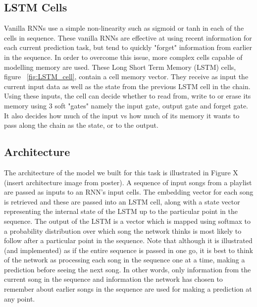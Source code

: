 \documentclass{article} %
\begin{document}
\subsection{LSTM Cells}
Vanilla RNNs use a simple non-linearity such as sigmoid or tanh in each of the cells in sequence. These vanilla RNNs are effective at using recent information for each current prediction task, but tend to quickly "forget" information from earlier in the sequence. In order to overcome this issue, more complex cells capable of modelling memory are used. These Long Short Term Memory (LSTM) cells, figure ~\ref{fig:LSTM_cell}, contain a cell memory vector. They receive as input the current input data as well as the state from the previous LSTM cell in the chain. Using these inputs, the cell can decide whether to read from, write to or erase its memory using 3 soft "gates" namely the input gate, output gate and forget gate. It also decides how much of the input vs how much of its memory it wants to pass along the chain as the state, or to the output. \cite{LSTM} 

\subsection{Architecture}
The architecture of the model we built for this task is illustrated in Figure X (insert architecture image from poster). A sequence of input songs from a playlist are passed as inputs to an RNN's input cells. The embedding vector for each song is retrieved and these are passed into an LSTM cell, along with a state vector representing the internal state of the LSTM up to the particular point in the sequence. The output of the LSTM is a vector which is mapped using softmax to a probability distribution over which song the network thinks is most likely to follow after a particular point in the sequence. Note that although it is illustrated (and implemented) as if the entire sequence is passed in one go, it is best to think of the network as processing each song in the sequence one at a time, making a prediction before seeing the next song. In other words, only information from the current song in the sequence and information the network has chosen to remember about earlier songs in the sequence are used for making a prediction at any point.  
\end{document}
